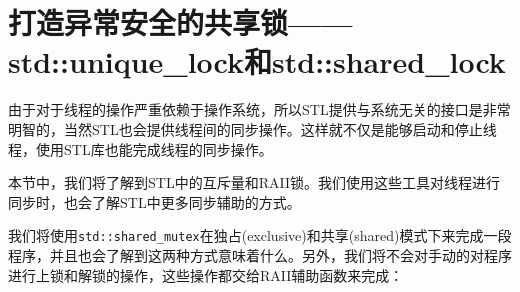 \section{打造异常安全的共享锁——std::unique\_lock和std::shared\_lock}

由于对于线程的操作严重依赖于操作系统，所以STL提供与系统无关的接口是非常明智的，当然STL也会提供线程间的同步操作。这样就不仅是能够启动和停止线程，使用STL库也能完成线程的同步操作。

本节中，我们将了解到STL中的互斥量和RAII锁。我们使用这些工具对线程进行同步时，也会了解STL中更多同步辅助的方式。


我们将使用\texttt{std::shared\_mutex}在独占(exclusive)和共享(shared)模式下来完成一段程序，并且也会了解到这两种方式意味着什么。另外，我们将不会对手动的对程序进行上锁和解锁的操作，这些操作都交给RAII辅助函数来完成：

